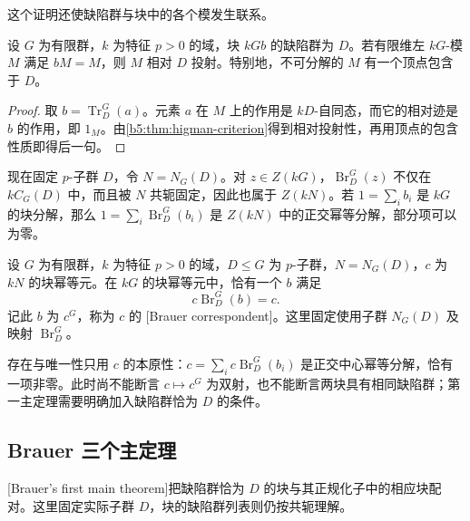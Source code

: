 这个证明还使缺陷群与块中的各个模发生联系。
\begin{corollary}\label{b5:cor:block-modules-relative-defect}
	设 \(G\) 为有限群，\(k\) 为特征 \(p>0\) 的域，块 \(kGb\) 的缺陷群为 \(D\)。若有限维左 \(kG\)-模 \(M\) 满足 \(bM=M\)，则 \(M\) 相对 \(D\) 投射。特别地，不可分解的 \(M\) 有一个顶点包含于 \(D\)。
\end{corollary}
\begin{proof}
	取 \(b=\operatorname{Tr}_D^G(a)\)。元素 \(a\) 在 \(M\) 上的作用是 \(kD\)-自同态，而它的相对迹是 \(b\) 的作用，即 \(1_M\)。由\cref{b5:thm:higman-criterion}得到相对投射性，再用顶点的包含性质即得后一句。
\end{proof}

现在固定 \(p\)-子群 \(D\)，令 \(N=N_G(D)\)。对 \(z\in Z(kG)\)，\(\operatorname{Br}_D^G(z)\) 不仅在 \(kC_G(D)\) 中，而且被 \(N\) 共轭固定，因此也属于 \(Z(kN)\)。若 \(1=\sum_i b_i\) 是 \(kG\) 的块分解，那么 \(1=\sum_i\operatorname{Br}_D^G(b_i)\) 是 \(Z(kN)\) 中的正交幂等分解，部分项可以为零。
\begin{definition}\label{b5:def:brauer-correspondent}
	设 \(G\) 为有限群，\(k\) 为特征 \(p>0\) 的域，\(D\le G\) 为 \(p\)-子群，\(N=N_G(D)\)，\(c\) 为 \(kN\) 的块幂等元。在 \(kG\) 的块幂等元中，恰有一个 \(b\) 满足
	\[
		c\operatorname{Br}_D^G(b)=c.
	\]
	记此 \(b\) 为 \(c^G\)，称为 \(c\) 的 [Brauer correspondent]。这里固定使用子群 \(N_G(D)\) 及映射 \(\operatorname{Br}_D^G\)。
\end{definition}
存在与唯一性只用 \(c\) 的本原性：\(c=\sum_i c\operatorname{Br}_D^G(b_i)\) 是正交中心幂等分解，恰有一项非零。此时尚不能断言 \(c\mapsto c^G\) 为双射，也不能断言两块具有相同缺陷群；第一主定理需要明确加入缺陷群恰为 \(D\) 的条件。

\subsection{Brauer 三个主定理}
\label{b5:subsec:0806:02}

[Brauer's first main theorem]把缺陷群恰为 \(D\) 的块与其正规化子中的相应块配对。这里固定实际子群 \(D\)，块的缺陷群列表则仍按共轭理解。

